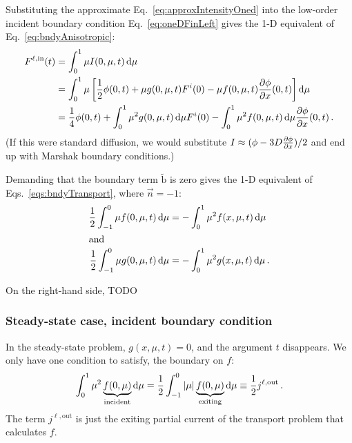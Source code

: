 Substituting the approximate Eq.~\eqref{eq:approxIntensityOned} into the
low-order incident boundary condition Eq.~\eqref{eq:oneDFinLeft} gives the 1-D
equivalent of Eq.~\eqref{eq:bndyAnisotropic}:
\begin{align} \nonumber
  F^{\ell,\mathrm{in}}(t)
  &= \int_{0}^{1} \mu I(0, \mu, t) \mathop{}\!\mathrm{d} \mu
  \\ \nonumber
  &= \int_{0}^{1} \mu \left[ \frac{1}{2} \phi(0, t) + \mu g(0, \mu, t) F^i(0)
  -  \mu f(0,\mu,t) \frac{\partial \phi}{\partial x}(0, t) \right] \mathop{}\!\mathrm{d} \mu
  \\ \label{eq:bndyAnisotropicOned}
  &= \frac{1}{4} \phi(0, t)
  + \int_{0}^{1} \mu^2 g(0, \mu, t) \mathop{}\!\mathrm{d} \mu F^i(0)
  - \int_{0}^{1} \mu^2 f(0, \mu, t) \mathop{}\!\mathrm{d} \mu \frac{\partial \phi}{\partial x}(0, t) \,.
\end{align}
(If this were standard diffusion, we would substitute $I \approx (\phi - 3 D
\frac{\partial \phi}{\partial x})/2$ and end up with Marshak boundary conditions.)

Demanding that the boundary term $\mathrm{ \tilde b}$ is zero gives the 1-D
equivalent of Eqs.~\eqref{eqs:bndyTransport}, where $\vec{n} = -1$:
\begin{subequations} \label{eqs:bndyTransportOned}
\begin{align} \label{eq:bndyFOned}
  \frac{1}{2} \int_{-1}^{0} \mu f(0, \mu, t) \mathop{}\!\mathrm{d}\mu
  &= - \int_{0}^{1} \mu^2 f(x, \mu, t) \mathop{}\!\mathrm{d}\mu
 \\ \intertext{and} \label{eq:bndyGOned}
  \frac{1}{2} \int_{-1}^{0} \mu g(0, \mu, t) \mathop{}\!\mathrm{d}\mu
  &= - \int_{0}^{1} \mu^2 g(x, \mu, t) \mathop{}\!\mathrm{d}\mu \,.
\end{align}
\end{subequations}

On the right-hand side, TODO

\subsubsection{Steady-state case, incident boundary condition}
In the steady-state problem, $g(x, \mu, t)=0$, and the argument $t$
disappears.
We only have one condition to satisfy, the boundary on $f$:
\begin{equation*}
  \int_{0}^{1} \mu^2 \underbrace{f(0, \mu)}_{\text{incident}} \mathop{}\!\mathrm{d}\mu
  = \frac{1}{2} \int_{-1}^{0} \left| \mu \right| 
  \underbrace{f(0, \mu) }_{\text{exiting}} \mathop{}\!\mathrm{d}\mu
  \equiv \frac{1}{2} j^{\ell,\mathrm{out}}\,.
\end{equation*}
The term $j^{\ell,\mathrm{out}}$ is just the exiting partial current of the
transport problem that calculates $f$.

